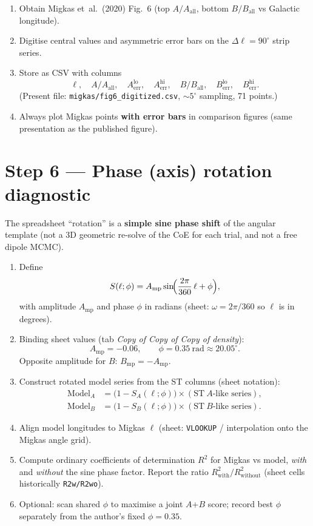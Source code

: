 \documentclass[11pt,a4paper]{article}
\begin{document}
\begin{enumerate}[leftmargin=*]
\item Obtain Migkas et~al.\ (2020) Fig.~6 (top \(A/A_{\mathrm{all}}\), bottom \(B/B_{\mathrm{all}}\) vs Galactic longitude).
\item Digitise central values and asymmetric error bars on the \(\Delta\ell=90^\circ\) strip series.
\item Store as CSV with columns
\[
\ell,\quad A/A_{\mathrm{all}},\quad A_{\mathrm{err}}^{\mathrm{lo}},\quad A_{\mathrm{err}}^{\mathrm{hi}},\quad
B/B_{\mathrm{all}},\quad B_{\mathrm{err}}^{\mathrm{lo}},\quad B_{\mathrm{err}}^{\mathrm{hi}}.
\]
(Present file: \texttt{migkas/fig6\_digitized.csv}, \(\sim 5^\circ\) sampling, 71 points.)
\item Always plot Migkas points \textbf{with error bars} in comparison figures (same presentation as the published figure).
\end{enumerate}

\section{Step 6 --- Phase (axis) rotation diagnostic}

The spreadsheet ``rotation'' is a \textbf{simple sine phase shift} of the angular template (not a 3D geometric re-solve of the CoE for each trial, and not a free dipole MCMC).

\begin{enumerate}[leftmargin=*]
\item Define
\[
S(\ell;\phi)=A_{\mathrm{mp}}\sin\!\Bigl(\frac{2\pi}{360}\,\ell+\phi\Bigr),
\]
with amplitude \(A_{\mathrm{mp}}\) and phase \(\phi\) in radians (sheet: \(\omega=2\pi/360\) so \(\ell\) is in degrees).
\item Binding sheet values (tab \emph{Copy of Copy of Copy of density}):
\[
A_{\mathrm{mp}}=-0.06,\qquad \phi=0.35\ \mathrm{rad}\approx 20.05^\circ.
\]
Opposite amplitude for \(B\): \(B_{\mathrm{mp}}=-A_{\mathrm{mp}}\).
\item Construct rotated model series from the ST columns (sheet notation):
\begin{align*}
\mathrm{Model}_A &= \bigl(1-S_A(\ell;\phi)\bigr)\times(\mathrm{ST\ }A\text{-like series}),\\
\mathrm{Model}_B &= \bigl(1-S_B(\ell;\phi)\bigr)\times(\mathrm{ST\ }B\text{-like series}).
\end{align*}
\item Align model longitudes to Migkas \(\ell\) (sheet: \texttt{VLOOKUP} / interpolation onto the Migkas angle grid).
\item Compute ordinary coefficients of determination \(R^2\) for Migkas vs model, \emph{with} and \emph{without} the sine phase factor. Report the ratio \(R^2_{\mathrm{with}}/R^2_{\mathrm{without}}\) (sheet cells historically \texttt{R2w/R2wo}).
\item Optional: scan shared \(\phi\) to maximise a joint \(A\)+\(B\) score; record best \(\phi\) separately from the author's fixed \(\phi=0.35\).
\end{enumerate}
\end{document}
